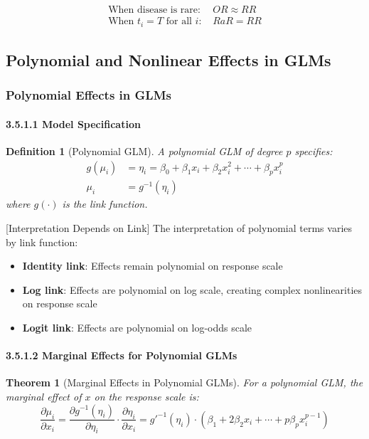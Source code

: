 \documentclass{article}
\newtheorem{definition}{Definition}
\newtheorem{theorem}{Theorem}
\begin{document}
\begin{align}
\text{When disease is rare: } &OR \approx RR \\
\text{When } t_i = T \text{ for all } i\text{: } &RaR = RR
\end{align}
   


\subsection{Polynomial and Nonlinear Effects in GLMs}

\subsubsection{Polynomial Effects in GLMs}

\paragraph{3.5.1.1 Model Specification}

\begin{definition}[Polynomial GLM]
A polynomial GLM of degree $p$ specifies:
\begin{align}
g(\mu_i) &= \eta_i = \beta_0 + \beta_1 x_i + \beta_2 x_i^2 + \cdots + \beta_p x_i^p \\
\mu_i &= g^{-1}(\eta_i)
\end{align}
where $g(\cdot)$ is the link function.
\end{definition}

[Interpretation Depends on Link]
The interpretation of polynomial terms varies by link function:
\begin{itemize}
    \item \textbf{Identity link}: Effects remain polynomial on response scale
    \item \textbf{Log link}: Effects are polynomial on log scale, creating complex nonlinearities on response scale
    \item \textbf{Logit link}: Effects are polynomial on log-odds scale
\end{itemize}


\paragraph{3.5.1.2 Marginal Effects for Polynomial GLMs}

\begin{theorem}[Marginal Effects in Polynomial GLMs]
For a polynomial GLM, the marginal effect of $x$ on the response scale is:
\begin{equation}
\frac{\partial \mu_i}{\partial x_i} = \frac{\partial g^{-1}(\eta_i)}{\partial \eta_i} \cdot \frac{\partial \eta_i}{\partial x_i} = g'^{-1}(\eta_i) \cdot \left(\beta_1 + 2\beta_2 x_i + \cdots + p\beta_p x_i^{p-1}\right)
\end{equation}
\end{theorem}
\end{document}
